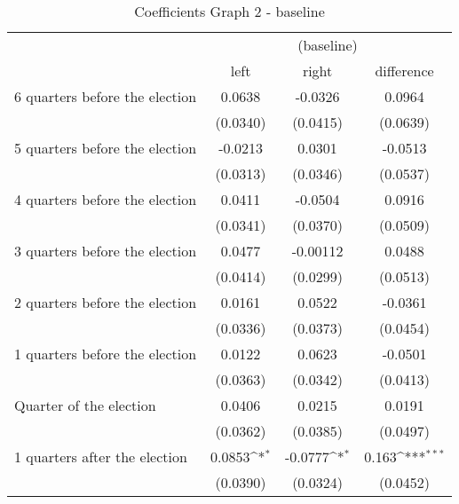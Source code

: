 \begin{table}[!ht]\centering \scriptsize
\def\sym#1{\ifmmode^{#1}\else\(^{#1}\)\fi}
\caption{Coefficients Graph 2 - baseline}
\begin{tabular}{l*{3}{c}}
\hline\hline
                    &\multicolumn{3}{c}{(baseline)}\\
                    &\multicolumn{1}{c}{left}&\multicolumn{1}{c}{right}&\multicolumn{1}{c}{difference}\\
\hline
 6 quarters before the election&      0.0638         &     -0.0326         &      0.0964         \\
                    &    (0.0340)         &    (0.0415)         &    (0.0639)         \\
[0.5em]
 5 quarters before the election&     -0.0213         &      0.0301         &     -0.0513         \\
                    &    (0.0313)         &    (0.0346)         &    (0.0537)         \\
[0.5em]
 4 quarters before the election&      0.0411         &     -0.0504         &      0.0916         \\
                    &    (0.0341)         &    (0.0370)         &    (0.0509)         \\
[0.5em]
 3 quarters before the election&      0.0477         &    -0.00112         &      0.0488         \\
                    &    (0.0414)         &    (0.0299)         &    (0.0513)         \\
[0.5em]
 2 quarters before the election&      0.0161         &      0.0522         &     -0.0361         \\
                    &    (0.0336)         &    (0.0373)         &    (0.0454)         \\
[0.5em]
 1 quarters before the election&      0.0122         &      0.0623         &     -0.0501         \\
                    &    (0.0363)         &    (0.0342)         &    (0.0413)         \\
[0.5em]
Quarter of the election&      0.0406         &      0.0215         &      0.0191         \\
                    &    (0.0362)         &    (0.0385)         &    (0.0497)         \\
[0.5em]
 1 quarters after the election&      0.0853\sym{*}  &     -0.0777\sym{*}  &       0.163\sym{***}\\
                    &    (0.0390)         &    (0.0324)         &    (0.0452)         \\

\end{tabular}
\end{table}

